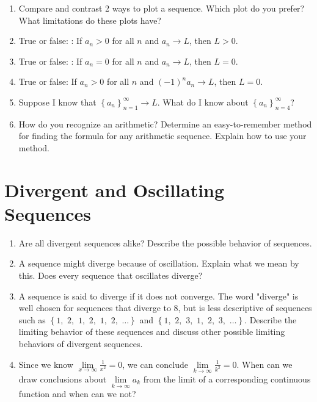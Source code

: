 \begin{enumerate}
\item Compare and contrast 2 ways to plot a sequence.  Which plot do you prefer?  What limitations do these plots have?

\item True or false: : If $a_n > 0$ for all $n$ and $a_n  \to L$, then $L > 0$.	

\item True or false: : If $a_n = 0$ for all $n$ and $a_n  \to L$, then $L = 0$.

\item True or false: If $a_n > 0$ for all $n$ and $\left( { - 1} \right)^n a_n  \to L$, then $L = 0$.

\item Suppose I know that $
\left\{ {a_n } \right\}_{n = 1}^\infty   \to L$.  What do I know about $\left\{ {a_n } \right\}_{n = 4}^\infty  $?

\item How do you recognize an arithmetic?  Determine an easy-to-remember method for finding the formula for any arithmetic sequence.  Explain how to use your method.

\end{enumerate}\section{Divergent and Oscillating Sequences}\begin{enumerate}

\item Are all divergent sequences alike?  Describe the possible behavior of sequences.

\item A sequence might diverge because of oscillation.  Explain what we mean by this.  Does every sequence that oscillates diverge?

\item A sequence is said to diverge if it does not converge.  The word "diverge" is well chosen for sequences that diverge to 8, but is less descriptive of sequences such as $
\left\{ {1,\,\,2,\,\,1,\,\,2,\,\,1,\,\,2,\,\, \ldots } \right\}$ and $\left\{ {1,\,\,2,\,\,3,\,\,1,\,\,2,\,\,3,\,\, \ldots } \right\}$.  Describe the limiting behavior of these sequences and discuss other possible limiting behaviors of divergent sequences.  \cite{SM}

\item Since we know $
\mathop {\lim }\limits_{x \to \infty } \frac{1}{{x^2 }} = 0$, we can conclude $
\mathop {\lim }\limits_{k \to \infty } \frac{1}{{k^2 }} = 0$.  When can we draw conclusions about $
\mathop {\lim }\limits_{k \to \infty } a_k $ from the limit of a corresponding continuous function and when can we not?


\end{enumerate}
